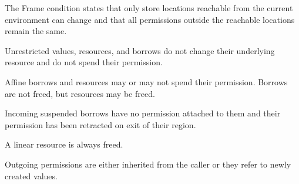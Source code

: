 The Frame condition states that only store locations reachable from
the current environment can change and that all permissions outside
the reachable locations remain the same.

Unrestricted values, resources, and borrows do not change their
underlying resource and do not spend their permission.

Affine borrows and resources may or may not spend their
permission. Borrows are not freed, but resources may be freed.

Incoming suspended borrows have no permission attached to them and
their permission has been retracted on exit of their region.

A linear resource is always freed.

Outgoing permissions are either inherited from the caller or they
refer to newly created values.


